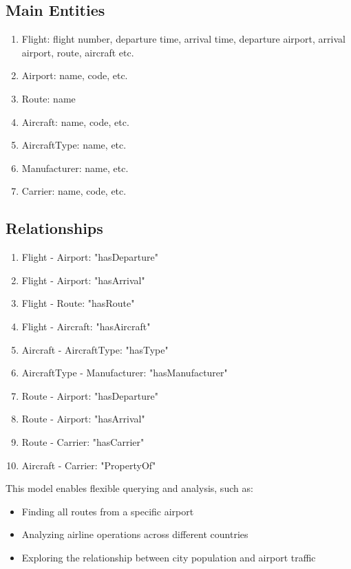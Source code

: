 \documentclass{article}
\begin{document}
\subsection{Main Entities}
\begin{enumerate}
    \item Flight: flight number, departure time, arrival time, departure airport, arrival airport, route, aircraft etc.
    \item Airport: name, code, etc.
    \item Route: name
    \item Aircraft: name, code, etc.
    \item AircraftType: name, etc.
    \item Manufacturer: name, etc.
    \item Carrier: name, code, etc.
\end{enumerate}

\subsection{Relationships}
\begin{enumerate}
    \item Flight - Airport: "hasDeparture"
    \item Flight - Airport: "hasArrival"
    \item Flight - Route: "hasRoute"
    \item Flight - Aircraft: "hasAircraft"
    \item Aircraft - AircraftType: "hasType"
    \item AircraftType - Manufacturer: "hasManufacturer"
    \item Route - Airport: "hasDeparture"
    \item Route - Airport: "hasArrival"
    \item Route - Carrier: "hasCarrier"
    \item Aircraft - Carrier: "PropertyOf"
\end{enumerate}

This model enables flexible querying and analysis, such as:
\begin{itemize}
    \item Finding all routes from a specific airport
    \item Analyzing airline operations across different countries
    \item Exploring the relationship between city population and airport traffic
\end{itemize}
\end{document}
